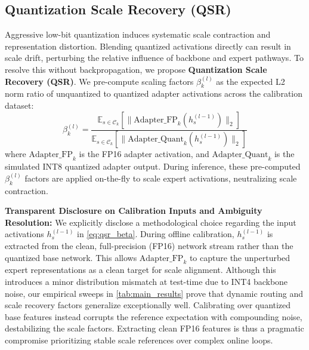 \subsection{Quantization Scale Recovery (QSR)}
Aggressive low-bit quantization induces systematic scale contraction and representation distortion. Blending quantized activations directly can result in scale drift, perturbing the relative influence of backbone and expert pathways. To resolve this without backpropagation, we propose \textbf{Quantization Scale Recovery (QSR)}. We pre-compute scaling factors $\beta_k^{(l)}$ as the expected L2 norm ratio of unquantized to quantized adapter activations across the calibration dataset:
\begin{equation}
    \beta_k^{(l)} = \frac{\mathbb{E}_{s \in \mathcal{C}_k} \left[ \| \text{Adapter\_FP}_k(h_s^{(l-1)}) \|_2 \right]}{\mathbb{E}_{s \in \mathcal{C}_k} \left[ \| \text{Adapter\_Quant}_k(h_s^{(l-1)}) \|_2 \right]}
\end{equation}
where $\text{Adapter\_FP}_k$ is the FP16 adapter activation, and $\text{Adapter\_Quant}_k$ is the simulated INT8 quantized adapter output. During inference, these pre-computed $\beta_k^{(l)}$ factors are applied on-the-fly to scale expert activations, neutralizing scale contraction.

\textbf{Transparent Disclosure on Calibration Inputs and Ambiguity Resolution:} We explicitly disclose a methodological choice regarding the input activations $h_s^{(l-1)}$ in \cref{eq:qsr_beta}. During offline calibration, $h_s^{(l-1)}$ is extracted from the clean, full-precision (FP16) network stream rather than the quantized base network. This allows $\text{Adapter\_FP}_k$ to capture the unperturbed expert representations as a clean target for scale alignment. Although this introduces a minor distribution mismatch at test-time due to INT4 backbone noise, our empirical sweeps in \cref{tab:main_results} prove that dynamic routing and scale recovery factors generalize exceptionally well. Calibrating over quantized base features instead corrupts the reference expectation with compounding noise, destabilizing the scale factors. Extracting clean FP16 features is thus a pragmatic compromise prioritizing stable scale references over complex online loops.

